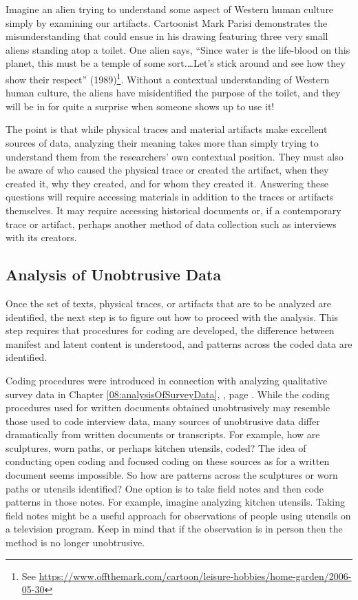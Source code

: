 Imagine an alien trying to understand some aspect of Western human culture simply by examining our artifacts. Cartoonist Mark Parisi demonstrates the misunderstanding that could ensue in his drawing featuring three very small aliens standing atop a toilet. One alien says, ``Since water is the life-blood on this planet, this must be a temple of some sort.…Let's stick around and see how they show their respect'' (1989)\footnote{See \url{https://www.offthemark.com/cartoon/leisure-hobbies/home-garden/2006-05-30}}. Without a contextual understanding of Western human culture, the aliens have misidentified the purpose of the toilet, and they will be in for quite a surprise when someone shows up to use it!

The point is that while physical traces and material artifacts make excellent sources of data, analyzing their meaning takes more than simply trying to understand them from the researchers' own contextual position. They must also be aware of who caused the physical trace or created the artifact, when they created it, why they created, and for whom they created it. Answering these questions will require accessing materials in addition to the traces or artifacts themselves. It may require accessing historical documents or, if a contemporary trace or artifact, perhaps another method of data collection such as interviews with its creators.

\subsection{Analysis of Unobtrusive Data}

Once the set of texts, physical traces, or artifacts that are to be analyzed are identified, the next step is to figure out how to proceed with the analysis. This step requires that procedures for coding are developed, the difference between manifest and latent content is understood, and patterns across the coded data are identified.

Coding procedures were introduced in connection with analyzing qualitative survey data in Chapter \ref{08:analysisOfSurveyData}, , page \pageref{08:analysisOfSurveyData}. While the coding procedures used for written documents obtained unobtrusively may resemble those used to code interview data, many sources of unobtrusive data differ dramatically from written documents or transcripts. For example, how are sculptures, worn paths, or perhaps kitchen utensils, coded? The idea of conducting open coding and focused coding on these sources as for a written document seems impossible. So how are patterns across the sculptures or worn paths or utensils identified? One option is to take field notes and then code patterns in those notes. For example, imagine analyzing kitchen utensils. Taking field notes might be a useful approach for observations of people using utensils on a television program. Keep in mind that if the observation is in person then the method is no longer unobtrusive.

